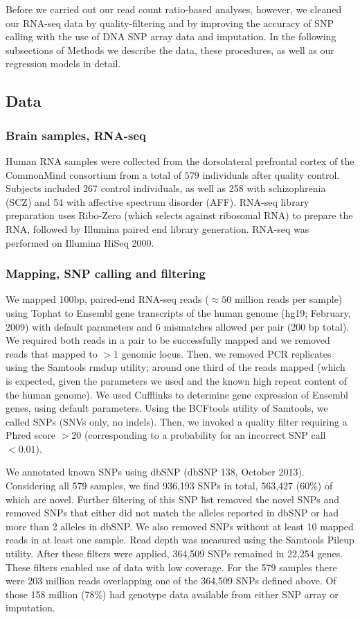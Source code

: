 \documentclass[12pt,letterpaper]{article}
\begin{document}
Before we carried out our read count ratio-based analyses, however, we cleaned
our RNA-seq data by quality-filtering and by improving the accuracy of SNP
calling with the use of DNA SNP array data and imputation. In the following
subsections of Methods we describe the data, these procedures, as well as our
regression models in detail.

\subsection{Data}

\subsubsection{Brain samples, RNA-seq}

Human RNA samples were collected from the dorsolateral prefrontal cortex of
the CommonMind consortium from a total of \(579\) individuals after
quality control. Subjects included 267 control individuals, as well as 258
with schizophrenia (SCZ) and 54 with affective spectrum disorder (AFF).
RNA-seq library preparation uses Ribo-Zero (which selects against ribosomal
RNA) to prepare the RNA, followed by Illumina paired end library generation.
RNA-seq was performed on Illumina HiSeq 2000.

\subsubsection{Mapping, SNP calling and filtering}

We mapped 100bp, paired-end RNA-seq reads (\(\approx50\) million reads per sample) using Tophat
to Ensembl gene transcripts of the human genome (hg19; February, 2009) with
default parameters and 6 mismatches allowed per pair (200 bp total). We
required both reads in a pair to be successfully mapped and we removed reads
that mapped to \(>1\) genomic locus. Then, we removed PCR replicates using the
Samtools rmdup utility; around one third of the reads mapped (which is
expected, given the parameters we used and the known high repeat content of
the human genome). We used Cufflinks to determine gene expression of Ensembl
genes, using default parameters. Using the BCFtools utility of Samtools, we
called SNPs (SNVs only, no indels). Then, we invoked a quality filter
requiring a Phred score \(>20\) (corresponding to a probability for an
incorrect SNP call \(<0.01\)).

We annotated known SNPs using dbSNP (dbSNP 138, October 2013). Considering all
579 samples, we find 936,193 SNPs in total, 563,427 (60\%) of which are novel.
Further filtering of this SNP list removed the novel SNPs and removed SNPs
that either did not match the alleles reported in dbSNP or had more than 2
alleles in dbSNP. We also removed SNPs without at least 10 mapped reads in at
least one sample. Read depth was measured using the Samtools Pileup utility.
After these filters were applied, 364,509 SNPs remained in 22,254 genes. These
filters enabled use of data with low coverage.  For the 579
samples there were 203 million reads overlapping one of the
364,509 SNPs defined above.  Of those 158 million (78\%) had genotype data
available from either SNP array or imputation.
\end{document}

